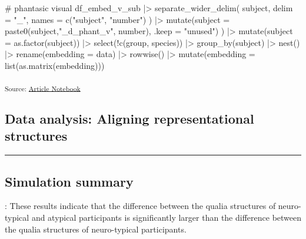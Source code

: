 \documentclass[
  authoryear]{elsarticle}
\newenvironment{Shaded}{\begin{snugshade}}{\end{snugshade}}
\newcommand{\AttributeTok}[1]{\textcolor[rgb]{0.40,0.45,0.13}{#1}}
\newcommand{\CommentTok}[1]{\textcolor[rgb]{0.37,0.37,0.37}{#1}}
\newcommand{\FunctionTok}[1]{\textcolor[rgb]{0.28,0.35,0.67}{#1}}
\newcommand{\NormalTok}[1]{\textcolor[rgb]{0.00,0.23,0.31}{#1}}
\newcommand{\SpecialCharTok}[1]{\textcolor[rgb]{0.37,0.37,0.37}{#1}}
\newcommand{\StringTok}[1]{\textcolor[rgb]{0.13,0.47,0.30}{#1}}
\begin{document}
\begin{Shaded}
\begin{Highlighting}[]
    \CommentTok{\# phantasic visual}
\NormalTok{    df\_embed\_v\_sub  }\SpecialCharTok{|\textgreater{}}
      \FunctionTok{separate\_wider\_delim}\NormalTok{(}
\NormalTok{        subject,}
        \AttributeTok{delim =} \StringTok{"\_"}\NormalTok{,}
        \AttributeTok{names =} \FunctionTok{c}\NormalTok{(}\StringTok{"subject"}\NormalTok{, }\StringTok{"number"}\NormalTok{)}
\NormalTok{      ) }\SpecialCharTok{|\textgreater{}} 
      \FunctionTok{mutate}\NormalTok{(}\AttributeTok{subject =} \FunctionTok{paste0}\NormalTok{(subject,}\StringTok{"\_d\_phant\_v"}\NormalTok{, number), }\AttributeTok{.keep =} \StringTok{"unused"}\NormalTok{)}
\NormalTok{  ) }\SpecialCharTok{|\textgreater{}} 
  \FunctionTok{mutate}\NormalTok{(}\AttributeTok{subject =} \FunctionTok{as.factor}\NormalTok{(subject)) }\SpecialCharTok{|\textgreater{}} 
  \FunctionTok{select}\NormalTok{(}\SpecialCharTok{!}\FunctionTok{c}\NormalTok{(group, species)) }\SpecialCharTok{|\textgreater{}} 
  \FunctionTok{group\_by}\NormalTok{(subject) }\SpecialCharTok{|\textgreater{}} 
  \FunctionTok{nest}\NormalTok{() }\SpecialCharTok{|\textgreater{}} 
  \FunctionTok{rename}\NormalTok{(}\AttributeTok{embedding =}\NormalTok{ data) }\SpecialCharTok{|\textgreater{}} 
  \FunctionTok{rowwise}\NormalTok{() }\SpecialCharTok{|\textgreater{}} 
  \FunctionTok{mutate}\NormalTok{(}\AttributeTok{embedding =} \FunctionTok{list}\NormalTok{(}\FunctionTok{as.matrix}\NormalTok{(embedding)))}
\end{Highlighting}
\end{Shaded}

\textsubscript{Source:
\href{https://m-delem.github.io/2499-similarity-manuscript/index.qmd.html}{Article
Notebook}}

\subsection{Data analysis: Aligning representational
structures}\label{data-analysis-aligning-representational-structures}

\begin{center}\rule{0.5\linewidth}{0.5pt}\end{center}

\subsection{Simulation summary}\label{simulation-summary}

\citet{kawakita2023}: These results indicate that the difference between
the qualia structures of neuro-typical and atypical participants is
significantly larger than the difference between the qualia structures
of neuro-typical participants.
\end{document}
